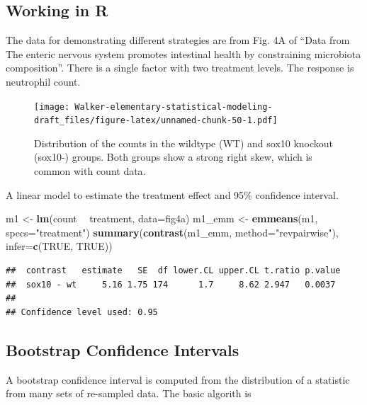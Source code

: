 \documentclass[]{book}
\newenvironment{Shaded}{\begin{snugshade}}{\end{snugshade}}
\newcommand{\KeywordTok}[1]{\textcolor[rgb]{0.13,0.29,0.53}{\textbf{#1}}}
\newcommand{\DataTypeTok}[1]{\textcolor[rgb]{0.13,0.29,0.53}{#1}}
\newcommand{\StringTok}[1]{\textcolor[rgb]{0.31,0.60,0.02}{#1}}
\newcommand{\OtherTok}[1]{\textcolor[rgb]{0.56,0.35,0.01}{#1}}
\newcommand{\OperatorTok}[1]{\textcolor[rgb]{0.81,0.36,0.00}{\textbf{#1}}}
\newcommand{\NormalTok}[1]{#1}
\begin{document}
\subsection{Working in R}\label{working-in-r-2}

The data for demonstrating different strategies are from Fig. 4A of
``Data from The enteric nervous system promotes intestinal health by
constraining microbiota composition''. There is a single factor with two
treatment levels. The response is neutrophil count.

\begin{figure}
\centering
\texttt{[image: Walker-elementary-statistical-modeling-draft\_files/figure-latex/unnamed-chunk-50-1.pdf]}
\caption{\label{fig:unnamed-chunk-50}Distribution of the counts in the
wildtype (WT) and sox10 knockout (sox10-) groups. Both groups show a
strong right skew, which is common with count data.}
\end{figure}

A linear model to estimate the treatment effect and 95\% confidence
interval.

\begin{Shaded}
\begin{Highlighting}[]
\NormalTok{m1 <-}\StringTok{ }\KeywordTok{lm}\NormalTok{(count }\OperatorTok{~}\StringTok{ }\NormalTok{treatment, }\DataTypeTok{data=}\NormalTok{fig4a)}
\NormalTok{m1_emm <-}\StringTok{ }\KeywordTok{emmeans}\NormalTok{(m1, }\DataTypeTok{specs=}\StringTok{"treatment"}\NormalTok{)}
\KeywordTok{summary}\NormalTok{(}\KeywordTok{contrast}\NormalTok{(m1_emm, }\DataTypeTok{method=}\StringTok{"revpairwise"}\NormalTok{), }\DataTypeTok{infer=}\KeywordTok{c}\NormalTok{(}\OtherTok{TRUE}\NormalTok{, }\OtherTok{TRUE}\NormalTok{))}
\end{Highlighting}
\end{Shaded}

\begin{verbatim}
##  contrast   estimate   SE  df lower.CL upper.CL t.ratio p.value
##  sox10 - wt     5.16 1.75 174      1.7     8.62 2.947   0.0037 
## 
## Confidence level used: 0.95
\end{verbatim}

\subsection{Bootstrap Confidence
Intervals}\label{bootstrap-confidence-intervals}

A bootstrap confidence interval is computed from the distribution of a
statistic from many sets of re-sampled data. The basic algorith is
\end{document}

